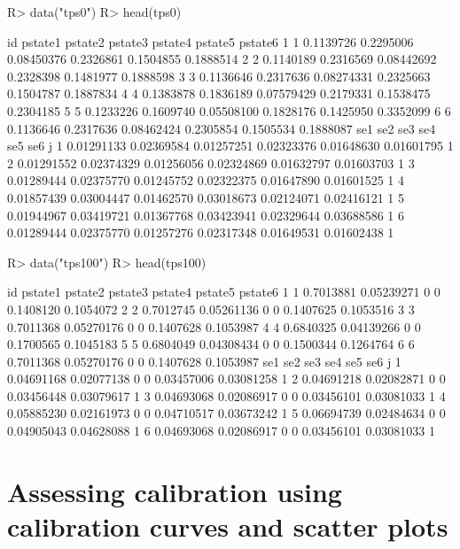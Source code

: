 \documentclass[article,shortnames]{jss}
\begin{document}
\begin{Schunk}
\begin{Sinput}
R> data("tps0")
R> head(tps0)
\end{Sinput}
\begin{Soutput}
  id   pstate1   pstate2    pstate3   pstate4   pstate5   pstate6
1  1 0.1139726 0.2295006 0.08450376 0.2326861 0.1504855 0.1888514
2  2 0.1140189 0.2316569 0.08442692 0.2328398 0.1481977 0.1888598
3  3 0.1136646 0.2317636 0.08274331 0.2325663 0.1504787 0.1887834
4  4 0.1383878 0.1836189 0.07579429 0.2179331 0.1538475 0.2304185
5  5 0.1233226 0.1609740 0.05508100 0.1828176 0.1425950 0.3352099
6  6 0.1136646 0.2317636 0.08462424 0.2305854 0.1505534 0.1888087
         se1        se2        se3        se4        se5        se6 j
1 0.01291133 0.02369584 0.01257251 0.02323376 0.01648630 0.01601795 1
2 0.01291552 0.02374329 0.01256056 0.02324869 0.01632797 0.01603703 1
3 0.01289444 0.02375770 0.01245752 0.02322375 0.01647890 0.01601525 1
4 0.01857439 0.03004447 0.01462570 0.03018673 0.02124071 0.02416121 1
5 0.01944967 0.03419721 0.01367768 0.03423941 0.02329644 0.03688586 1
6 0.01289444 0.02375770 0.01257276 0.02317348 0.01649531 0.01602438 1
\end{Soutput}
\begin{Sinput}
R> data("tps100")
R> head(tps100)
\end{Sinput}
\begin{Soutput}
  id   pstate1    pstate2 pstate3 pstate4   pstate5   pstate6
1  1 0.7013881 0.05239271       0       0 0.1408120 0.1054072
2  2 0.7012745 0.05261136       0       0 0.1407625 0.1053516
3  3 0.7011368 0.05270176       0       0 0.1407628 0.1053987
4  4 0.6840325 0.04139266       0       0 0.1700565 0.1045183
5  5 0.6804049 0.04308434       0       0 0.1500344 0.1264764
6  6 0.7011368 0.05270176       0       0 0.1407628 0.1053987
         se1        se2 se3 se4        se5        se6 j
1 0.04691168 0.02077138   0   0 0.03457006 0.03081258 1
2 0.04691218 0.02082871   0   0 0.03456448 0.03079617 1
3 0.04693068 0.02086917   0   0 0.03456101 0.03081033 1
4 0.05885230 0.02161973   0   0 0.04710517 0.03673242 1
5 0.06694739 0.02484634   0   0 0.04905043 0.04628088 1
6 0.04693068 0.02086917   0   0 0.03456101 0.03081033 1
\end{Soutput}
\end{Schunk}

\section[Assessing calibration using calibration curves and scatter plots]{Assessing calibration using calibration curves and scatter plots} \label{sec:calibplots}
\end{document}
